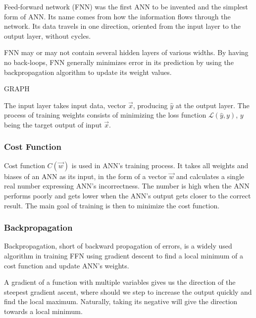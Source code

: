 Feed-forward network (FNN) was the first ANN to be invented and the simplest form of ANN. Its name comes from how the information flows through the network. Its data travels in one direction, oriented from the input layer to the output layer, without cycles.\cite{ffnbrilliant} 

FNN may or may not contain several hidden layers of various widths. By having no back-loops, FNN generally minimizes error in its prediction by using the backpropagation algorithm to update its weight values.\cite{mainTypesANN}

GRAPH

The input layer takes input data, vector $\vec{x}$, producing $\hat{y}$ at the output layer. The process of training weights
 consists of minimizing the loss function $\mathcal{L}(\hat{y},y)$, $y$ being the target output of input $\vec{x}$.\cite{lipton2015critical}


\subsubsection{Cost Function}
Cost function $C(\vec{w})$ is used in ANN's training process. It takes all weights and biases of an ANN as its input, in the form of a vector $\vec{w}$ and calculates a single real number expressing ANN's incorrectness.\cite{Goodfellow-et-al-2016} The number is high when the ANN performs poorly and gets lower when the ANN's output gets closer to the correct result. The main goal of training is then to minimize the cost function. 

\subsubsection{Backpropagation}
Backpropagation, short of backward propagation of errors, is a widely used algorithm in training FFN using gradient descent to find a local minimum of a cost function and update ANN's weights.\cite{birlliantbackprop}

A gradient of a function with multiple variables gives us the direction of the steepest gradient ascent, where should we step to increase the output quickly and find the local maximum. Naturally, taking its negative will give the direction towards a local minimum. 

